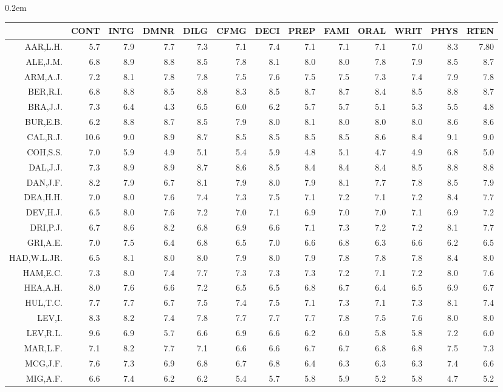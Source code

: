 \documentclass[nogin, dvips,12pt,a4paper,twoside]{amsart}
\begin{document}
\begin{table}[ht]
\begin{center}\tabcolsep0.2em%
\tiny{
\begin{tabular}{rrrrrrrrrrrrr}
\hline
& CONT&INTG&DMNR&DILG&CFMG&DECI&PREP&FAMI&ORAL&WRIT&PHYS&RTEN \\ 
\hline
AAR,L.H.&5.7&7.9&7.7&7.3&7.1&7.4&7.1&7.1&7.1&7.0&8.3&7.80 \\ 
ALE,J.M.&6.8&8.9&8.8&8.5&7.8&8.1&8.0&8.0&7.8&7.9&8.5&8.7\\ 
ARM,A.J.&7.2&8.1&7.8&7.8&7.5&7.6&7.5&7.5&7.3&7.4&7.9&7.8\\ 
BER,R.I.&6.8&8.8&8.5&8.8&8.3&8.5&8.7&8.7&8.4&8.5&8.8&8.7\\ 
BRA,J.J.&7.3&6.4&4.3&6.5&6.0&6.2&5.7&5.7&5.1&5.3&5.5&4.8\\ 
BUR,E.B.&6.2&8.8&8.7&8.5&7.9&8.0&8.1&8.0&8.0&8.0&8.6&8.6\\ 
CAL,R.J.&10.6&9.0&8.9&8.7&8.5&8.5&8.5&8.5&8.6&8.4&9.1&9.0\\ 
COH,S.S.&7.0&5.9&4.9&5.1&5.4&5.9&4.8&5.1&4.7&4.9&6.8&5.0\\ 
DAL,J.J.&7.3&8.9&8.9&8.7&8.6&8.5&8.4&8.4&8.4&8.5&8.8&8.8\\ 
DAN,J.F.&8.2&7.9&6.7&8.1&7.9&8.0&7.9&8.1&7.7&7.8&8.5&7.9\\ 
DEA,H.H.&7.0&8.0&7.6&7.4&7.3&7.5&7.1&7.2&7.1&7.2&8.4&7.7\\ 
DEV,H.J.&6.5&8.0&7.6&7.2&7.0&7.1&6.9&7.0&7.0&7.1&6.9&7.2\\ 
DRI,P.J.&6.7&8.6&8.2&6.8&6.9&6.6&7.1&7.3&7.2&7.2&8.1&7.7\\ 
GRI,A.E.&7.0&7.5&6.4&6.8&6.5&7.0&6.6&6.8&6.3&6.6&6.2&6.5\\ 
HAD,W.L.JR.&6.5&8.1&8.0&8.0&7.9&8.0&7.9&7.8&7.8&7.8&8.4&8.0\\ 
HAM,E.C.&7.3&8.0&7.4&7.7&7.3&7.3&7.3&7.2&7.1&7.2&8.0&7.6\\ 
HEA,A.H.&8.0&7.6&6.6&7.2&6.5&6.5&6.8&6.7&6.4&6.5&6.9&6.7\\ 
HUL,T.C.&7.7&7.7&6.7&7.5&7.4&7.5&7.1&7.3&7.1&7.3&8.1&7.4\\ 
LEV,I.&8.3&8.2&7.4&7.8&7.7&7.7&7.7&7.8&7.5&7.6&8.0&8.0\\ 
LEV,R.L.&9.6&6.9&5.7&6.6&6.9&6.6&6.2&6.0&5.8&5.8&7.2&6.0\\ 
MAR,L.F.&7.1&8.2&7.7&7.1&6.6&6.6&6.7&6.7&6.8&6.8&7.5&7.3\\ 
MCG,J.F.&7.6&7.3&6.9&6.8&6.7&6.8&6.4&6.3&6.3&6.3&7.4&6.6\\ 
MIG,A.F.&6.6&7.4&6.2&6.2&5.4&5.7&5.8&5.9&5.2&5.8&4.7&5.2\\ 

\end{tabular}}
\end{center}
\end{table}
\end{document}
